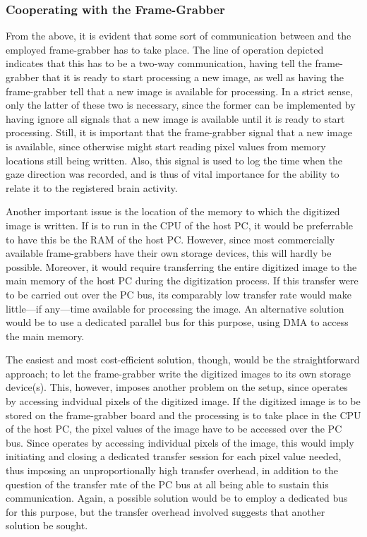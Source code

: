 \subsubsection{Cooperating with the Frame-Grabber}

From the above, it is evident that some sort of communication between
{\octopus} and the employed frame-grabber has to take place.  The line
of operation depicted indicates that this has to be a two-way
communication, having {\octopus} tell the frame-grabber that it is
ready to start processing a new image, as well as having the
frame-grabber tell {\octopus} that a new image is available for
processing.  In a strict sense, only the latter of these two is
necessary, since the former can be implemented by having {\octopus}
ignore all signals that a new image is available until it is ready to
start processing.  Still, it is important that the frame-grabber
signal that a new image is available, since otherwise {\octopus} might
start reading pixel values from memory locations still being written.
Also, this signal is used to log the time when the gaze direction was
recorded, and is thus of vital importance for the ability to relate it
to the registered brain activity.

Another important issue is the location of the memory to which the
digitized image is written.  If {\octopus} is to run in the CPU of the
host PC, it would be preferrable to have this be the RAM of the host
PC.  However, since most commercially available frame-grabbers have
their own storage devices, this will hardly be possible.  Moreover, it
would require transferring the entire digitized image to the main
memory of the host PC during the digitization process.  If this
transfer were to be carried out over the PC bus, its comparably low
transfer rate would make little---if any---time available for
processing the image.  An alternative solution would be to use a
dedicated parallel bus for this purpose, using DMA to access the main
memory.  

The easiest and most cost-efficient solution, though, would be the
straightforward approach; to let the frame-grabber write the digitized
images to its own storage device(s).  This, however, imposes another
problem on the setup, since {\octopus} operates by accessing indvidual
pixels of the digitized image.  If the digitized image is to be stored
on the frame-grabber board and the processing is to take place in the
CPU of the host PC, the pixel values of the image have to be accessed
over the PC bus.  Since {\octopus} operates by accessing individual
pixels of the image, this would imply initiating and closing a
dedicated transfer session for each pixel value needed, thus imposing
an unproportionally high transfer overhead, in addition to the
question of the transfer rate of the PC bus at all being able to
sustain this communication.  Again, a possible solution would be to
employ a dedicated bus for this purpose, but the transfer overhead
involved suggests that another solution be sought.

